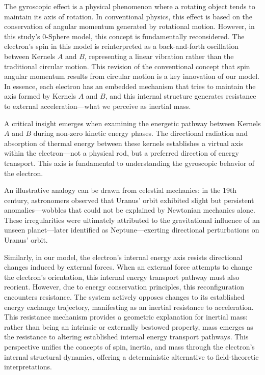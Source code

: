 \documentclass[%
 reprint,
 amsmath,amssymb,
 aps,
]{revtex4-1}
\numberwithin{equation}{section}%
\begin{document}
The gyroscopic effect is a physical phenomenon where a rotating object tends to maintain its axis of rotation. In conventional physics, this effect is based on the conservation of angular momentum generated by rotational motion. However, in this study's 0-Sphere model, this concept is fundamentally reconsidered. The electron's spin in this model is reinterpreted as a back-and-forth oscillation between Kernels $A$ and $B$, representing a linear vibration rather than the traditional circular motion. This revision of the conventional concept that spin angular momentum results from circular motion is a key innovation of our model. In essence, each electron has an embedded mechanism that tries to maintain the axis formed by Kernels $A$ and $B$, and this internal structure generates resistance to external acceleration—what we perceive as inertial mass.

A critical insight emerges when examining the energetic pathway between Kernels $A$ and $B$ during non-zero kinetic energy phases. The directional radiation and absorption of thermal energy between these kernels establishes a virtual axis within the electron---not a physical rod, but a preferred direction of energy transport. This axis is fundamental to understanding the gyroscopic behavior of the electron.

An illustrative analogy can be drawn from celestial mechanics: in the 19th century, astronomers observed that Uranus’ orbit exhibited slight but persistent anomalies---wobbles that could not be explained by Newtonian mechanics alone. These irregularities were ultimately attributed to the gravitational influence of an unseen planet---later identified as Neptune---exerting directional perturbations on Uranus’ orbit.

Similarly, in our model, the electron’s internal energy axis resists directional changes induced by external forces. When an external force attempts to change the electron's orientation, this internal energy transport pathway must also reorient. However, due to energy conservation principles, this reconfiguration encounters resistance. The system actively opposes changes to its established energy exchange trajectory, manifesting as an inertial resistance to acceleration. This resistance mechanism provides a geometric explanation for inertial mass: rather than being an intrinsic or externally bestowed property, mass emerges as the resistance to altering established internal energy transport pathways. This perspective unifies the concepts of spin, inertia, and mass through the electron's internal structural dynamics, offering a deterministic alternative to field-theoretic interpretations.
\end{document}
